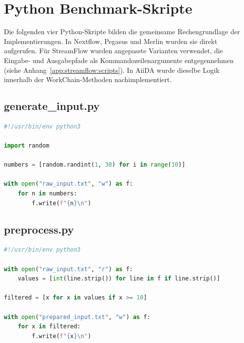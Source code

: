%

\lstset{breaklines=true, breakatwhitespace=false}

\chapter{Python Benchmark-Skripte}
\label{app:scripts}

Die folgenden vier Python-Skripte bilden die gemeinsame Rechengrundlage der Implementierungen.
In Nextflow, Pegasus und Merlin wurden sie direkt aufgerufen. Für StreamFlow wurden angepasste
Varianten verwendet, die Eingabe- und Ausgabepfade als Kommandozeilenargumente entgegennehmen
(siehe Anhang~\ref{app:streamflow:scripts}). In AiiDA wurde dieselbe Logik innerhalb der
WorkChain-Methoden nachimplementiert.

\section{generate\_input.py}
\label{app:scripts:generate}

\begin{lstlisting}[language=Python,
                   caption={generate\_input.py: Eingabedaten erzeugen},
                   label={lst:app:generate}]
#!/usr/bin/env python3

import random

numbers = [random.randint(1, 30) for i in range(10)]

with open("raw_input.txt", "w") as f:
    for n in numbers:
        f.write(f"{n}\n")
\end{lstlisting}

\section{preprocess.py}
\label{app:scripts:preprocess}

\begin{lstlisting}[language=Python,
                   caption={preprocess.py: Daten filtern},
                   label={lst:app:preprocess}]
#!/usr/bin/env python3

with open("raw_input.txt", "r") as f:
    values = [int(line.strip()) for line in f if line.strip()]

filtered = [x for x in values if x >= 10]

with open("prepared_input.txt", "w") as f:
    for x in filtered:
        f.write(f"{x}\n")
\end{lstlisting}

